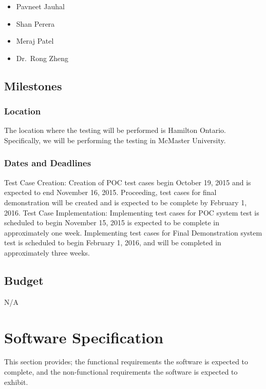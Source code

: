 \documentclass[12pt]{article}
\begin{document}
\begin{itemize}
 \item Pavneet Jauhal
 \item Shan Perera
 \item Meraj Patel
 \item Dr.\ Rong Zheng
\end{itemize}  

\subsection{Milestones}

\subsubsection{Location}
The location where the testing will be performed is Hamilton Ontario. Specifically, we will be performing the testing in McMaster University. 


\subsubsection{Dates and Deadlines}

Test Case Creation:
Creation of POC test cases begin October 19, 2015 and is expected to end November 16, 2015. Proceeding, test cases for final demonstration will be created and is expected to be complete by February 1, 2016.
\newline
\newline
Test Case Implementation:
Implementing test cases for POC system test is scheduled to begin November 15, 2015 is expected to be complete in approximately one week.
\newline
\newline
Implementing test cases for Final Demonstration system test is scheduled to begin February 1, 2016, and will be completed in approximately three weeks. 


\subsection{Budget}
N/A

%
%

\section{ Software Specification}
This section provides; the functional requirements the 
software is expected to complete, and the non-functional requirements the software is expected to exhibit.
\end{document}
